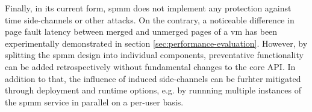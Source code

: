 Finally, in its current form, \ac{spmm} does not implement any protection against time side-channels or other attacks.
On the contrary, a noticeable difference in page fault latency between merged and unmerged pages of a \ac{vm} has been experimentally demonstrated in section \ref{sec:performance-evaluation}.
However, by splitting the \ac{spmm} design into individual components, preventative functionality can be added retrospectively without fundamental changes to the core API.
In addition to that, the influence of induced side-channels can be furhter mitigated through deployment and runtime options, e.g. by runnning multiple instances of the \ac{spmm} service in parallel on a per-user basis.
